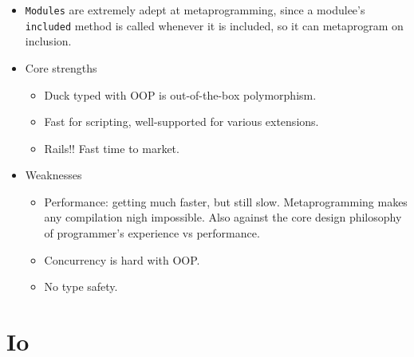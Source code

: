 \documentclass[10pt]{article}
\begin{document}
\begin{itemize}
    \item \lstinline{Modules} are extremely adept at metaprogramming, since a
        modulee's \lstinline{included} method is called whenever it is included, so
        it can metaprogram on inclusion.
    \item Core strengths
        \begin{itemize}
            \item Duck typed with OOP is out-of-the-box polymorphism.
            \item Fast for scripting, well-supported for various extensions.
            \item Rails!! Fast time to market.
        \end{itemize}
    \item Weaknesses
        \begin{itemize}
            \item Performance: getting much faster, but still slow.
                Metaprogramming makes any compilation nigh impossible. Also
                against the core design philosophy of programmer's experience vs
                performance.
            \item Concurrency is hard with OOP.\@
            \item No type safety.
        \end{itemize}
\end{itemize}

\section{Io}
\end{document}
